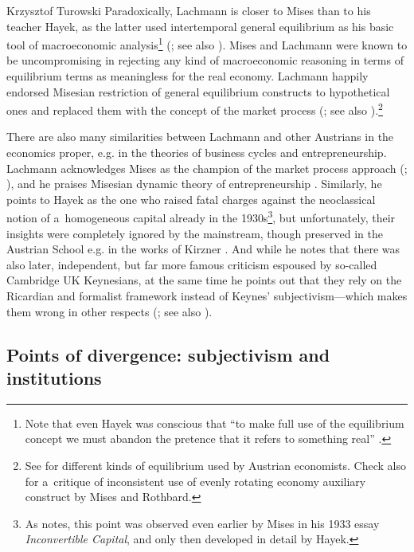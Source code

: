 \begin{artengenv}{Krzysztof Turowski}
Paradoxically, Lachmann is closer to Mises than to his teacher Hayek, as the latter used intertemporal general equilibrium as his basic tool of macroeconomic analysis\footnote{Note that even Hayek was conscious that ``to make full use of the equilibrium concept we must abandon the pretence that it refers to something real'' \parencite[23]{hayek-pure}.} (\cite[190]{lachmann-hayek}; see also \cite{lachmann-hayek-sraffa}).
Mises and Lachmann were known to be uncompromising in rejecting any kind of macroeconomic reasoning in terms of equilibrium terms as meaningless for the real economy.
Lachmann happily endorsed Misesian restriction of general equilibrium constructs to hypothetical ones and replaced them with the concept of the market process (\cite[183]{lachmann-mises-process}; see also \cite[230--231]{mises-planning}).\footnote{See \textcite{salerno-equilibrium} for different kinds of equilibrium used by Austrian economists. Check also \textcite{cowen-ere} for a~critique of inconsistent use of evenly rotating economy auxiliary construct by Mises and Rothbard.}

There are also many similarities between Lachmann and other Austrians in the economics proper, e.g. in the theories of business cycles and entrepreneurship.
Lachmann acknowledges Mises as the champion of the market process approach (\cite[182--183]{lachmann-mises-process}; \citeyear[60]{lachmann-kaleidic}), and he praises Misesian dynamic theory of entrepreneurship \parencite[102]{lachmann-ha}. Similarly, he points to Hayek as the one who raised fatal charges against the neoclassical notion of a~homogeneous capital already in the 1930s\footnote{As \textcite[lxii-lxiii]{hulsmann} notes, this point was observed even earlier by Mises in his 1933 essay \emph{Inconvertible Capital}, and only then developed in detail by Hayek.}, but unfortunately, their insights were completely ignored by the mainstream, though preserved in the Austrian School e.g. in the works of Kirzner \parencite[195--198]{lachmann-hayek}.
And while he notes that there was also later, independent, but far more famous criticism espoused by so-called Cambridge UK Keynesians, at the same time he points out that they rely on the Ricardian and formalist framework instead of Keynes' subjectivism---which makes them wrong in other respects (\cite[21, 51--52]{lachmann1973macro}; see also \cite[33]{lachmann-crisis}).

\subsection{Points of divergence: subjectivism and institutions}



\end{artengenv}
